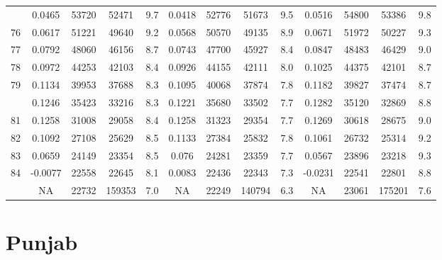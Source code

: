 \documentclass[
  14pt,
]{article}
\begin{document}
\begin{longtable}[t]{lcccccccccccc}
\addlinespace
75 & 0.0465 & 53720 & 52471 & 9.7 & 0.0418 & 52776 & 51673 & 9.5 & 0.0516 & 54800 & 53386 & 9.8\\
76 & 0.0617 & 51221 & 49640 & 9.2 & 0.0568 & 50570 & 49135 & 8.9 & 0.0671 & 51972 & 50227 & 9.3\\
77 & 0.0792 & 48060 & 46156 & 8.7 & 0.0743 & 47700 & 45927 & 8.4 & 0.0847 & 48483 & 46429 & 9.0\\
78 & 0.0972 & 44253 & 42103 & 8.4 & 0.0926 & 44155 & 42111 & 8.0 & 0.1025 & 44375 & 42101 & 8.7\\
79 & 0.1134 & 39953 & 37688 & 8.3 & 0.1095 & 40068 & 37874 & 7.8 & 0.1182 & 39827 & 37474 & 8.7\\
\addlinespace
80 & 0.1246 & 35423 & 33216 & 8.3 & 0.1221 & 35680 & 33502 & 7.7 & 0.1282 & 35120 & 32869 & 8.8\\
81 & 0.1258 & 31008 & 29058 & 8.4 & 0.1258 & 31323 & 29354 & 7.7 & 0.1269 & 30618 & 28675 & 9.0\\
82 & 0.1092 & 27108 & 25629 & 8.5 & 0.1133 & 27384 & 25832 & 7.8 & 0.1061 & 26732 & 25314 & 9.2\\
83 & 0.0659 & 24149 & 23354 & 8.5 & 0.076 & 24281 & 23359 & 7.7 & 0.0567 & 23896 & 23218 & 9.3\\
84 & -0.0077 & 22558 & 22645 & 8.1 & 0.0083 & 22436 & 22343 & 7.3 & -0.0231 & 22541 & 22801 & 8.8\\
\addlinespace
85 & NA & 22732 & 159353 & 7.0 & NA & 22249 & 140794 & 6.3 & NA & 23061 & 175201 & 7.6\\*
\end{longtable}

\pagebreak

\hypertarget{punjab}{%
\section{Punjab}\label{punjab}}
\end{document}
